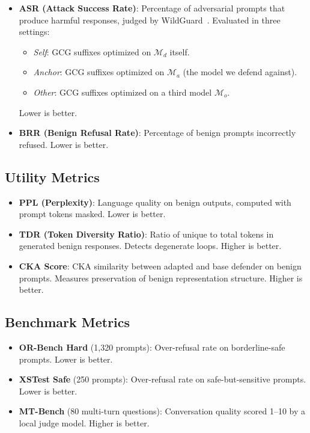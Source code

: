 \documentclass[11pt]{article}
\begin{document}
\begin{itemize}[noitemsep]
    \item \textbf{ASR (Attack Success Rate)}: Percentage of adversarial prompts that produce harmful responses, judged by WildGuard~\cite{wildguard}. Evaluated in three settings:
    \begin{itemize}[noitemsep]
        \item \emph{Self}: GCG suffixes optimized on $\mathcal{M}_d$ itself.
        \item \emph{Anchor}: GCG suffixes optimized on $\mathcal{M}_a$ (the model we defend against).
        \item \emph{Other}: GCG suffixes optimized on a third model $\mathcal{M}_o$.
    \end{itemize}
    Lower is better.

    \item \textbf{BRR (Benign Refusal Rate)}: Percentage of benign prompts incorrectly refused. Lower is better.
\end{itemize}

\subsection{Utility Metrics}

\begin{itemize}[noitemsep]
    \item \textbf{PPL (Perplexity)}: Language quality on benign outputs, computed with prompt tokens masked. Lower is better.
    \item \textbf{TDR (Token Diversity Ratio)}: Ratio of unique to total tokens in generated benign responses. Detects degenerate loops. Higher is better.
    \item \textbf{CKA Score}: CKA similarity between adapted and base defender on benign prompts. Measures preservation of benign representation structure. Higher is better.
\end{itemize}

\subsection{Benchmark Metrics}

\begin{itemize}[noitemsep]
    \item \textbf{OR-Bench Hard} (1,320 prompts): Over-refusal rate on borderline-safe prompts. Lower is better.
    \item \textbf{XSTest Safe} (250 prompts): Over-refusal rate on safe-but-sensitive prompts. Lower is better.
    \item \textbf{MT-Bench} (80 multi-turn questions): Conversation quality scored 1--10 by a local judge model. Higher is better.
\end{itemize}
\end{document}
